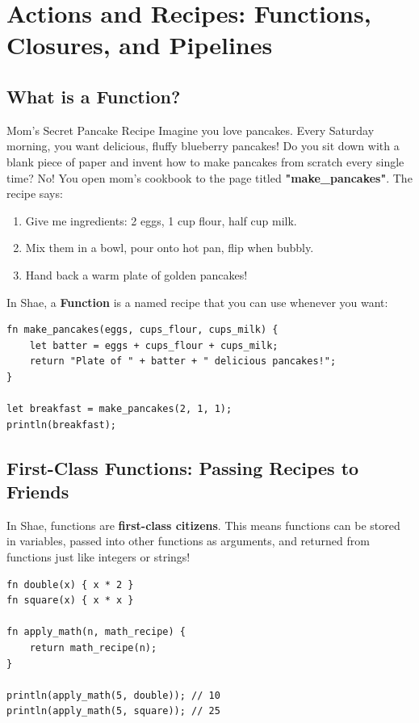 \chapter{Actions and Recipes: Functions, Closures, and Pipelines}

\section{What is a Function?}

\begin{kidbox}{Mom's Secret Pancake Recipe}
Imagine you love pancakes. Every Saturday morning, you want delicious, fluffy blueberry pancakes!
Do you sit down with a blank piece of paper and invent how to make pancakes from scratch every single time?
No! You open mom's cookbook to the page titled \textbf{"make\_pancakes"}.
The recipe says:
\begin{enumerate}
    \item Give me ingredients: 2 eggs, 1 cup flour, half cup milk.
    \item Mix them in a bowl, pour onto hot pan, flip when bubbly.
    \item Hand back a warm plate of golden pancakes!
\end{enumerate}
In Shae, a \textbf{Function} is a named recipe that you can use whenever you want:
\begin{lstlisting}[language=shaelang]
fn make_pancakes(eggs, cups_flour, cups_milk) {
    let batter = eggs + cups_flour + cups_milk;
    return "Plate of " + batter + " delicious pancakes!";
}

let breakfast = make_pancakes(2, 1, 1);
println(breakfast);
\end{lstlisting}
\end{kidbox}

\section{First-Class Functions: Passing Recipes to Friends}

In Shae, functions are \textbf{first-class citizens}. This means functions can be stored in variables, passed into other functions as arguments, and returned from functions just like integers or strings!

\begin{lstlisting}[language=shaelang]
fn double(x) { x * 2 }
fn square(x) { x * x }

fn apply_math(n, math_recipe) {
    return math_recipe(n);
}

println(apply_math(5, double)); // 10
println(apply_math(5, square)); // 25
\end{lstlisting}

